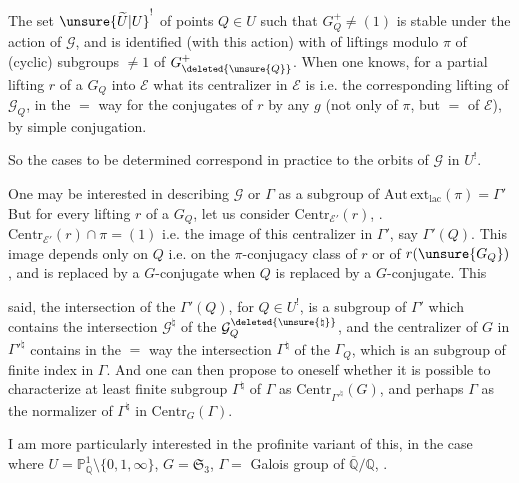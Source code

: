 
The set $\unsure{\widetilde U|U}^{!}$ of points $Q\in U$ such that $G_Q^+\ne(1)$ is stable under the action of $\mathcal G$, and is identified (with this action) with  of  liftings modulo $\pi$ of (cyclic) subgroups $\ne1$ of $G^{+}_{\deleted{\unsure{Q}}}$. When one knows, for a partial lifting $r$ of a $G_Q$ into $\mathcal E$ what its centralizer in $\mathcal E$ is i.e. the corresponding lifting of $\mathcal G_Q$,  in the $=$ way for the conjugates of $r$ by any  $g$ (not only of $\pi$, but $=$ of $\mathcal E$), by simple conjugation.

So the cases to be determined correspond in practice to the orbits of $\mathcal G$ in $U^{!}$.

One may be interested in describing $\mathcal G$ or $\Gamma$ as a subgroup of $\mathrm{Aut\,ext}_{\mathrm{lac}}(\pi)=\Gamma'$  But for every lifting $r$ of a $G_Q$, let us consider $\mathrm{Centr}_{\mathcal E'}(r)$,  .  $\mathrm{Centr}_{\mathcal E'}(r)\cap\pi=(1)$ i.e.  the image of this centralizer in $\Gamma'$, say $\Gamma'(Q)$. This image depends only on $Q$ i.e. on the $\pi$-conjugacy class of $r$ or of $r(\unsure{G_Q})$, and is replaced by a $G$-conjugate when $Q$ is replaced by a $G$-conjugate. This



said, the intersection  of the $\Gamma'(Q)$, for $Q\in U^{!}$, is a subgroup of $\Gamma'$ which contains the intersection  $\mathcal G^{\natural}$ of the $\mathcal G_Q^{\deleted{\unsure{\natural}}}$, and the centralizer of $G$ in $\Gamma'^{\natural}$ contains in the $=$ way the intersection  $\Gamma^{\natural}$ of the $\Gamma_Q$, which is an  subgroup of finite index in $\Gamma$. And one can then propose to oneself whether it is possible to characterize at least  finite subgroup $\Gamma^{\natural}$ of $\Gamma$ as $\mathrm{Centr}_{\Gamma'^{\natural}}(G)$, and  perhaps $\Gamma$ as the normalizer of $\Gamma^{\natural}$ in  $\mathrm{Centr}_{G}(\Gamma)$.

I am more particularly interested in the profinite variant of this, in the case where $U=\mathbb P^1_{\mathbb Q}\setminus\{0,1,\infty\}$, $G=\mathfrak S_3$, $\Gamma={}$ Galois group of $\overline{\mathbb Q}/\mathbb Q$,  .

